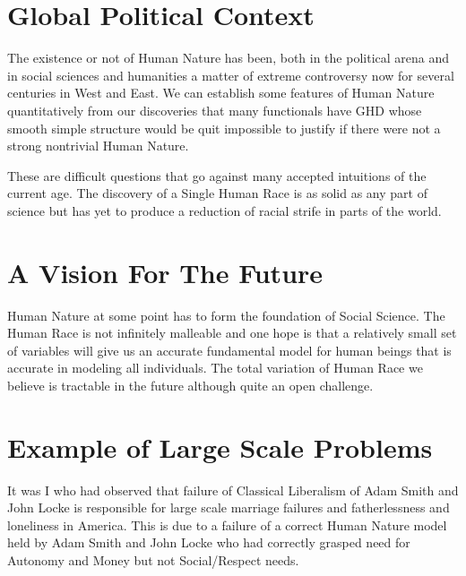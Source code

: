 \documentclass{amsart}
\begin{document}
\section{Global Political Context}

The existence or not of Human Nature has been, both in the political arena and in social sciences and humanities a matter of extreme controversy now for several centuries in West and East.  We can establish some features of Human Nature quantitatively from our discoveries that many functionals have GHD whose smooth simple structure would be quit impossible to justify if there were not a strong nontrivial Human Nature.

These are difficult questions that go against many accepted intuitions of the current age.  The discovery of a Single Human Race is as solid as any part of science but has yet to produce a reduction of racial strife in parts of the world.

\section{A Vision For The Future}

Human Nature at some point has to form the foundation of Social Science.  The Human Race is not infinitely malleable and one hope is that a relatively small set of variables will give us an accurate fundamental model for human beings that is accurate in modeling all individuals.  The total variation of Human Race we believe is tractable in the future although quite an open challenge.

\section{Example of Large Scale Problems}

It was I who had observed that failure of Classical Liberalism of Adam Smith and John Locke is responsible for large scale marriage failures and fatherlessness and loneliness in America.  This is due to a failure of a correct Human Nature model held by Adam Smith and John Locke who had correctly grasped need for Autonomy and Money but not Social/Respect needs.
\end{document}
